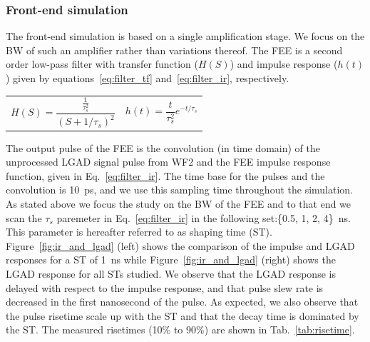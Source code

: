 \documentclass[preprint,1p]{elsarticle}
\begin{document}
\subsubsection{Front-end simulation}\label{sec:fee}
The front-end simulation is based on a single amplification stage. We focus on the BW of such an amplifier rather than variations
thereof. The FEE is a second order low-pass filter with transfer function ($H(S)$)
and impulse response ($h(t)$) given by equations~\ref{eq:filter_tf} and~\ref{eq:filter_ir}, respectively.

 \begin{tabularx}{\textwidth}{XX}
 \begin{equation}\label{eq:filter_tf}
   H(S) = \frac{\frac{1}{\tau_{s}^{2}}}{(S+1/\tau_{s})^{2}}
 \end{equation}
     &
 \begin{equation}\label{eq:filter_ir}
     h(t) = \frac{t}{\tau_s^2}e^{-t/\tau_{s}}
 \end{equation}
 \end{tabularx}\par

The output pulse of the FEE is the convolution (in time domain) of the unprocessed LGAD signal pulse from WF2 and the FEE impulse response
function, given in Eq.~\ref{eq:filter_ir}. The time base for the pulses and the convolution is 10~\si{ps}, and we use this sampling time
throughout the simulation. As stated above we focus the study on the BW of the FEE and to that end we scan the $\tau_{s}$ paremeter
in Eq.~\ref{eq:filter_ir} in the following set:\{0.5, 1, 2, 4\}~\si{ns}. This parameter is hereafter referred to as
shaping time (ST). Figure~\ref{fig:ir_and_lgad} (left) shows the comparison of the impulse and LGAD responses for a ST of 1~\si{ns} while
Figure~\ref{fig:ir_and_lgad} (right) shows the LGAD response for all STs studied. We observe that the LGAD response is delayed with respect
to the impulse response,  and that pulse slew rate is decreased in the first nanosecond of the pulse. As expected, we also observe
that the pulse risetime scale up with the ST and that the decay time is dominated by the ST.
The measured risetimes (10\% to 90\%) are shown in Tab.~\ref{tab:risetime}.
\end{document}
